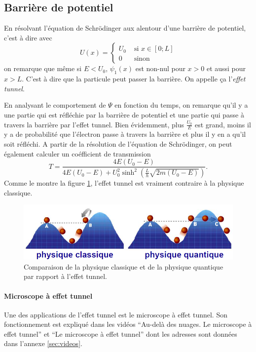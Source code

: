 \subsection{Barrière de potentiel}
En résolvant l'équation de Schrödinger
aux alentour d'une barrière de potentiel,
c'est à dire avec
\[ U(x) = \left\{
  \begin{aligned}
    U_0 & \text{ si } x \in [0; L]\\
    0 & \text{ sinon}
  \end{aligned}
\right. \]
on remarque que même si $E < U_0$,
$\psi_1(x)$ est non-nul pour $x > 0$ et aussi pour $x > L$.
C'est à dire que la particule peut passer la barrière.
On appelle ça l'\emph{effet tunnel}.

En analysant le comportement de $\Psi$ en fonction du temps,
on remarque qu'il y a
une partie qui est réfléchie par la barrière de potentiel et
une partie qui passe à travers la barrière par l'effet tunnel.
Bien évidemment, plus $\frac{U_0}{E}$ est grand,
moins il y a de probabilité que l'électron passe à travers la barrière
et plus il y en a qu'il soit réfléchi.
A partir de la résolution de l'équation de Schrödinger, on
peut également calculer un coéfficient de transmission
\[ T = \frac{4E(U_0-E)}{4E(U_0-E)+U_0^2\sinh^2(\frac{L}{h}\sqrt{2m(U_0-E)})}.\]
Comme le montre la figure \ref{fig:tunnel}, l'effet
tunnel est vraiment contraire à la physique classique.

\begin{figure}[ht]
	\centering
	\includegraphics[scale=0.8]{img/tunnel.png}
	\caption{Comparaison de la physique classique et
	de la physique quantique par rapport à l'effet
	tunnel.}
	\label{fig:tunnel}
\end{figure}

\paragraph{Microscope à effet tunnel}
Une des applications de l'effet tunnel est le
microscope à effet tunnel. Son fonctionnement est expliqué dans
les vidéos ``Au-delà des nuages. Le microscope à effet tunnel''
et ``Le microscope à effet tunnel'' dont les adresses sont
données dans l'annexe \ref{sec:videos}.

